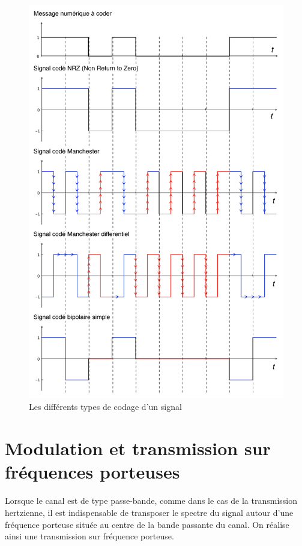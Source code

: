 \documentclass[11pt,english,french]{scrreprt}
\theoremstyle{remark}
\theoremstyle{definition}
\begin{document}
\begin{figure}[h!]
	\center
	\includegraphics[scale=.9]{graphes/codages}
	\caption{Les différents types de codage d'un signal}
\end{figure}
\clearpage

\section{Modulation et transmission sur fréquences porteuses} %

	Lorsque le canal est de type passe-bande, comme dans le cas de la transmission hertzienne, il est indispensable de transposer le spectre du signal autour d'une fréquence porteuse située au centre de la bande passante du canal. On réalise ainsi une transmission sur fréquence porteuse.
\end{document}
